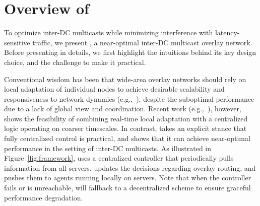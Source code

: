 \section{Overview of \name}
\label{sec:overview}

To optimize inter-DC multicasts while minimizing
interference with latency-sensitive traffic, we present {\em \name},
a near-optimal inter-DC multicast overlay network.
Before presenting \name in details,
we first highlight the intuitions behind its 
key design choice, and the challenge to make it practical.







Conventional wisdom has been that wide-area overlay networks 
should rely on local adaptation of individual 
nodes to achieve desirable scalability
and responsiveness to network dynamics (e.g.,~\cite{Andreev2013Designing,Repantis2010Scaling,Huang2014A}), 
despite the suboptimal performance due to 
a lack of global view and coordination. 
Recent work (e.g.,~\cite{mukerjee2014enabling}), however,
shows the feasibility of combining real-time 
local adaptation with a centralized logic operating 
on coarser timescales.
In contrast, \name takes an explicit stance that 
fully centralized control is practical,
and shows that it can achieve near-optimal performance in
the setting of inter-DC multicasts.
As illustrated in Figure~\ref{fig:framework}, 
\name uses a centralized controller that periodically pulls 
information from all servers, updates the decisions regarding overlay
routing, and pushes them to agents running locally on servers. 
Note that when the controller fails or is unreachable, 
\name will fallback to a decentralized scheme 
to ensure graceful performance degradation.

